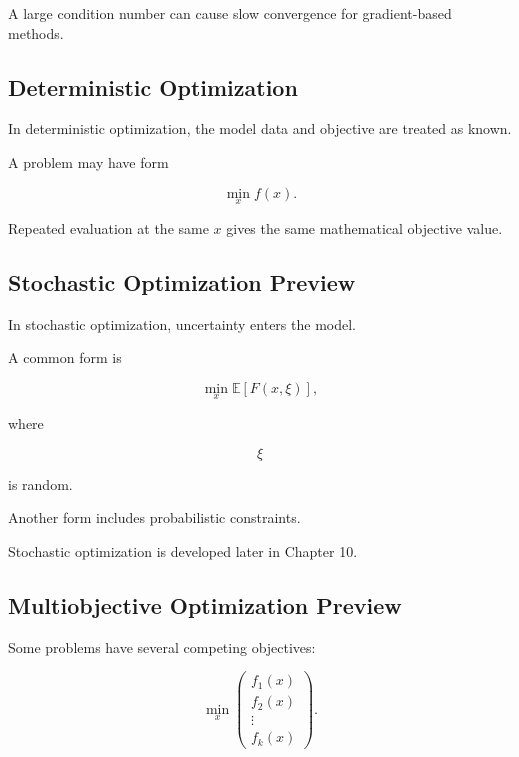 A large condition number can cause slow convergence for gradient-based
methods.

\subsection{Deterministic Optimization}
\label{subsec:deterministic-optimization}

In deterministic optimization, the model data and objective are treated
as known.

A problem may have form

\[
\boxed{
\min_x f(x).
}
\]

Repeated evaluation at the same \(x\) gives the same mathematical
objective value.

\subsection{Stochastic Optimization Preview}
\label{subsec:stochastic-optimization-preview}

In stochastic optimization, uncertainty enters the model.

A common form is

\[
\boxed{
\min_x
\mathbb{E}
[
F(x,\xi)
],
}
\]

where

\[
\xi
\]

is random.

Another form includes probabilistic constraints.

Stochastic optimization is developed later in Chapter 10.

\subsection{Multiobjective Optimization Preview}
\label{subsec:multiobjective-optimization-preview}

Some problems have several competing objectives:

\[
\boxed{
\min_x
\begin{pmatrix}
f_1(x)\\
f_2(x)\\
\vdots\\
f_k(x)
\end{pmatrix}.
}
\]


